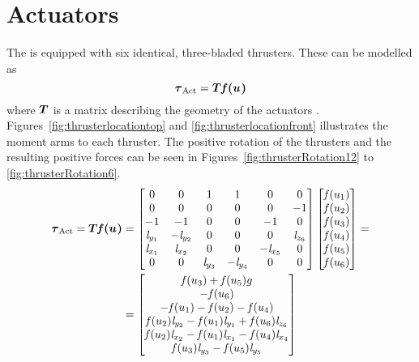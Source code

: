 \section{Actuators}\label{sec:act}   
The \abbrROV is equipped with six identical, three-bladed thrusters. These can be modelled as
\begin{equation}\label{eq:act}
    \boldsymbol{\tau}_{\text{Act}} = \boldsymbol{T} \boldsymbol{\mathit{f}(u_{})} 
\end{equation}
where $\boldsymbol{T}$ is a matrix describing the geometry of the actuators \citep[p. 401]{fossen2011}. Figures~\ref{fig:thrusterlocationtop} and \ref{fig:thrusterlocationfront} illustrates the moment arms to each thruster. The positive rotation of the thrusters and the resulting positive forces can be seen in Figures~\ref{fig:thrusterRotation12} to \ref{fig:thrusterRotation6}.
\begin{align}\label{eq:actuatorGeometry}
\begin{split}
    \boldsymbol{\tau}_{\text{Act}} = \boldsymbol{T} \boldsymbol{\mathit{f}(u_{})} 
    &=
    \begin{bmatrix}
    0& 0& 1& 1& 0& 0\\
    0& 0& 0&  0& 0& -1\\
    -1& -1& 0& 0& -1& 0\\
    \mathit{l}_{y_{1}} & -\mathit{l}_{y_{2}} & 0 &  0 &  0 & \mathit{l}_{z_{6}} \\
    \mathit{l}_{x_{1}} & \mathit{l}_{x_{2}} & 0 & 0 & -\mathit{l}_{x_{5}} & 0 \\
    0 & 0 & \mathit{l}_{y_{3}} & -\mathit{l}_{y_{4}} & 0 & 0 \\
    \end{bmatrix}
    \begin{bmatrix}
    \mathit{f}(u_{1}) \\
    \mathit{f}(u_{2}) \\
    \mathit{f}(u_{3}) \\
    \mathit{f}(u_{4}) \\
    \mathit{f}(u_{5}) \\
    \mathit{f}(u_{6}) \\
    \end{bmatrix}
    = \\
    &=\begin{bmatrix}
     \mathit{f}(u_{3}) + \mathit{f}(u_{5}) g \\
     -\mathit{f}(u_{6}) \\
     -\mathit{f}(u_{1}) - \mathit{f}(u_{2}) - \mathit{f}(u_{4}) \\
    \mathit{f}(u_{2}) \mathit{l}_{y_{2}} - \mathit{f}(u_{1}) \mathit{l}_{y_{1}} + \mathit{f}(u_{6}) \mathit{l}_{z_{6}} \\
    \mathit{f}(u_{2}) \mathit{l}_{x_{2}} - \mathit{f}(u_{1}) \mathit{l}_{x_{1}} - \mathit{f}(u_{4}) \mathit{l}_{x_{4}} \\
    \mathit{f}(u_{3}) \mathit{l}_{y_{3}} - \mathit{f}(u_{5}) \mathit{l}_{y_{5}} \\
    \end{bmatrix}
\end{split}
\end{align}
